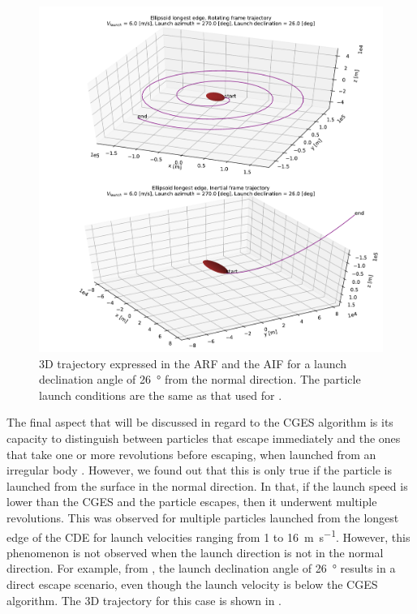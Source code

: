 \begin{figure}[htb]
\centering
\captionsetup{justification=centering}
\includegraphics[width=\textwidth, height=0.55\textheight, keepaspectratio=true]{non_conservative_escape_speed/directEscape_3D_trajectory_declination26.pdf}
\caption{3D trajectory expressed in the \gls{ARF} and the \gls{AIF} for a launch declination angle of \SI{26}{\degree} from the normal direction. The particle launch conditions are the same as that used for \protect{}.}
\label{fig:3d_traj_declination_26}
\end{figure}
\FloatBarrier
The final aspect that will be discussed in regard to the \gls{CGES} algorithm is its capacity to distinguish between particles that escape immediately and the ones that take one or more revolutions before escaping, when launched from an irregular body \parencite{scheeres2002fate}. However, we found out that this is only true if the particle is launched from the surface in the normal direction. In that, if the launch speed is lower than the \gls{CGES} and the particle escapes, then it underwent multiple revolutions. This was observed for multiple particles launched from the longest edge of the \gls{CDE} for launch velocities ranging from 1 to \SI{16}{\metre \per \second}. However, this phenomenon is not observed when the launch direction is not in the normal direction. For example, from , the launch declination angle of \SI{26}{\degree} results in a direct escape scenario, even though the launch velocity is below the \gls{CGES} algorithm. The 3D trajectory for this case is shown in .

